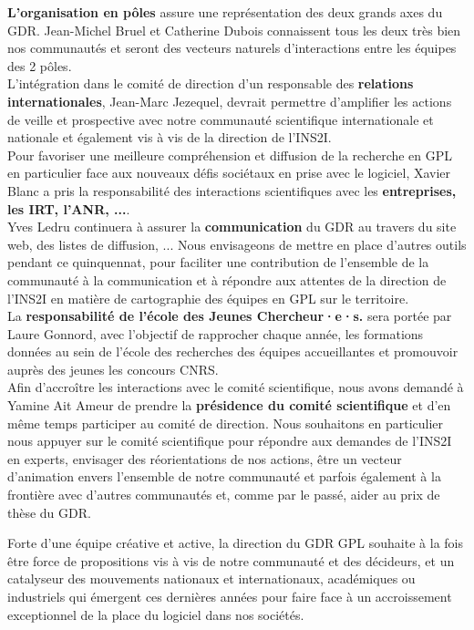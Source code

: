 \documentclass[11pt]{article}
\newcommand{\gpl}[0]{génie de la programmation et du logiciel}
\begin{document}
\textbf{L'organisation en pôles} assure une représentation des deux grands axes du GDR. Jean-Michel Bruel et Catherine Dubois connaissent tous les deux très bien nos communautés et seront des vecteurs naturels d'interactions entre les équipes des 2 pôles. \\
L'intégration dans le comité de direction d'un responsable des \textbf{relations internationales}, Jean-Marc Jezequel, devrait permettre d'amplifier les actions de veille et prospective avec notre communauté scientifique internationale et nationale et également vis à vis de la direction de l'INS2I. \\
Pour favoriser une meilleure compréhension et diffusion de la recherche en GPL en particulier face aux nouveaux défis sociétaux en prise avec le logiciel, Xavier Blanc a pris la responsabilité des interactions scientifiques avec les \textbf{entreprises, les IRT, l'ANR, ...}.\\
Yves Ledru continuera à assurer la \textbf{communication } du GDR au travers du site web, des listes de diffusion, ... Nous envisageons de mettre en place d'autres outils pendant ce quinquennat, pour faciliter une contribution de l'ensemble de la communauté à la communication et à répondre aux attentes de la direction de l'INS2I en matière de cartographie des équipes en GPL sur le territoire.\\
La \textbf{responsabilité de l'école des Jeunes Chercheur·e·s.} sera portée par Laure Gonnord, avec l'objectif de rapprocher chaque année, les formations données au sein de l'école des recherches des équipes accueillantes et promouvoir auprès des jeunes les concours CNRS. \\
Afin d'accroître les interactions avec le comité scientifique, nous avons demandé à Yamine Ait Ameur de prendre la \textbf{présidence du comité scientifique} et d'en même temps participer au comité de direction. Nous souhaitons en particulier nous appuyer sur le comité scientifique pour répondre aux demandes de l'INS2I en experts, envisager des réorientations de nos actions, être un vecteur d'animation envers l'ensemble de notre communauté et parfois également à la frontière avec d'autres communautés et, comme par le passé, aider au prix de thèse du GDR.



Forte d'une équipe créative et active, la direction du GDR GPL souhaite à la fois être force de propositions vis à vis de notre communauté et des décideurs, et un catalyseur des mouvements nationaux et internationaux, académiques ou industriels qui émergent ces dernières années pour faire face à un accroissement exceptionnel de la place du logiciel dans nos sociétés.
\end{document}
